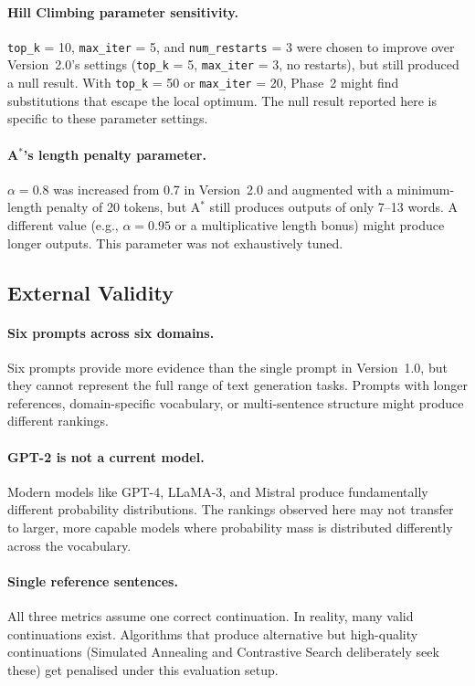 \documentclass[12pt]{article}
\begin{document}
	\paragraph{Hill Climbing parameter sensitivity.}
	\texttt{top\_k} = 10, \texttt{max\_iter} = 5, and \texttt{num\_restarts} = 3 were chosen to improve over Version~2.0's settings (\texttt{top\_k} = 5, \texttt{max\_iter} = 3, no restarts), but still produced a null result. With \texttt{top\_k} = 50 or \texttt{max\_iter} = 20, Phase~2 might find substitutions that escape the local optimum. The null result reported here is specific to these parameter settings.
	
	\paragraph{A$^*$'s length penalty parameter.}
	$\alpha = 0.8$ was increased from 0.7 in Version~2.0 and augmented with a minimum-length penalty of 20 tokens, but A$^*$ still produces outputs of only 7--13 words. A different value (e.g., $\alpha = 0.95$ or a multiplicative length bonus) might produce longer outputs. This parameter was not exhaustively tuned.
	
	\subsection{External Validity}
	
	\paragraph{Six prompts across six domains.}
	Six prompts provide more evidence than the single prompt in Version~1.0, but they cannot represent the full range of text generation tasks. Prompts with longer references, domain-specific vocabulary, or multi-sentence structure might produce different rankings.
	
	\paragraph{GPT-2 is not a current model.}
	Modern models like GPT-4, LLaMA-3, and Mistral produce fundamentally different probability distributions. The rankings observed here may not transfer to larger, more capable models where probability mass is distributed differently across the vocabulary.
	
	\paragraph{Single reference sentences.}
	All three metrics assume one correct continuation. In reality, many valid continuations exist. Algorithms that produce alternative but high-quality continuations (Simulated Annealing and Contrastive Search deliberately seek these) get penalised under this evaluation setup.
	
\end{document}
